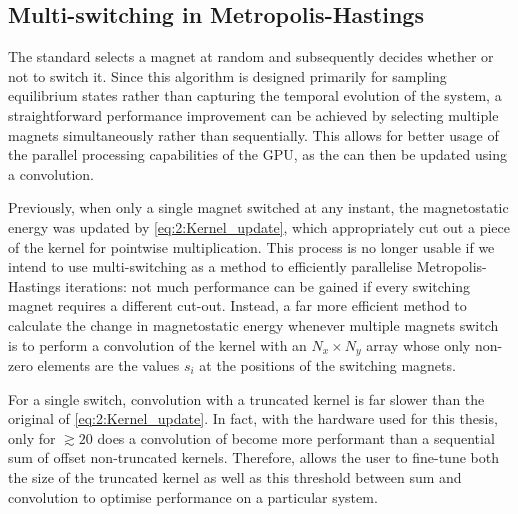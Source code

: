 \subsection{Multi-switching in Metropolis-Hastings}\label{sec:2:MultiSwitch}
The standard  selects a magnet at random and subsequently decides whether or not to switch it.
Since this algorithm is designed primarily for sampling equilibrium states rather than capturing the temporal evolution of the system, a straightforward performance improvement can be achieved by selecting multiple magnets simultaneously rather than sequentially.
This allows for better usage of the parallel processing capabilities of the GPU, as the  can then be updated using a convolution. \\\par
Previously, when only a single magnet switched at any instant, the magnetostatic energy was updated by \cref{eq:2:Kernel_update}, which appropriately cut out a piece of the kernel for pointwise multiplication.
This process is no longer usable if we intend to use multi-switching as a method to efficiently parallelise Metropolis-Hastings iterations: not much performance can be gained if every switching magnet requires a different cut-out.
Instead, a far more efficient method to calculate the change in magnetostatic energy whenever multiple magnets switch is to perform a convolution of the kernel with an $N_x \times N_y$ array whose only non-zero elements are the values $s_i$ at the positions of the switching magnets. \par
For a single switch, convolution with a truncated kernel is far slower than the original  of \eqref{eq:2:Kernel_update}.
In fact, with the hardware used for this thesis, only for $\gtrsim 20$  does a convolution of  become more performant than a sequential sum of offset non-truncated kernels.
Therefore, \hotspice allows the user to fine-tune both the size of the truncated kernel as well as this threshold between sum and convolution to optimise performance on a particular system.

